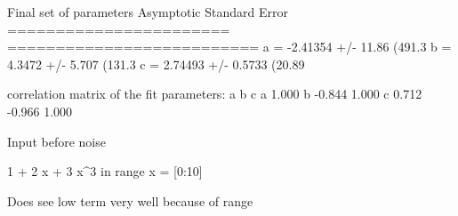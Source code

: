 Final set of parameters            Asymptotic Standard Error
=======================            ==========================
a               = -2.41354         +/- 11.86        (491.3%
b               = 4.3472           +/- 5.707        (131.3%
c               = 2.74493          +/- 0.5733       (20.89%

correlation matrix of the fit parameters:
                a      b      c      
a               1.000 
b              -0.844  1.000 
c               0.712 -0.966  1.000

Input before noise

1 + 2 x + 3 x^3   in range  x = [0:10]

Does see low term very well because of range